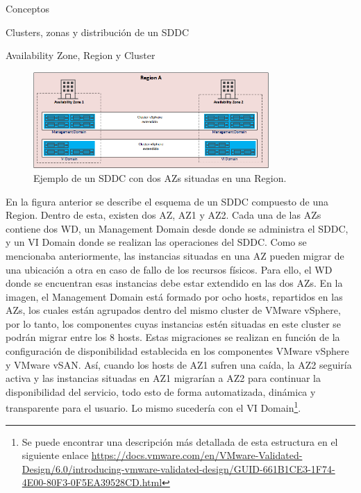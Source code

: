 \begin{section}{Conceptos}
\begin{subsection}{Clusters, zonas y distribución de un SDDC}
\begin{subsubsection}{Availability Zone, Region y Cluster}
\begin{figure}[h!]
  \centering
  \includegraphics[width=0.8\textwidth]{imaxes/conceptosPrevios/AZRegionCluster.png}
  \caption{Ejemplo de un SDDC con dos AZs situadas en una Region.}
  \label{fig:az-region-cluster}
\end{figure}
En la figura anterior se describe el esquema de un SDDC compuesto de una Region. Dentro de esta, existen dos AZ, AZ1 y AZ2. Cada una de las AZs contiene dos WD, un Management Domain desde donde se administra el SDDC, y un VI Domain donde se realizan las operaciones del SDDC. Como se mencionaba anteriormente, las instancias situadas en una AZ pueden migrar de una ubicación a otra en caso de fallo de los recursos físicos. Para ello, el WD donde se encuentran esas instancias debe estar extendido en las dos AZs. En la imagen, el Management Domain está formado por ocho hosts, repartidos en las AZs, los cuales están agrupados dentro del mismo cluster de VMware vSphere, por lo tanto, los componentes cuyas instancias estén situadas en este cluster se podrán migrar entre los 8 hosts. Estas migraciones se realizan en función de la configuración de disponibilidad establecida en los componentes VMware vSphere y VMware vSAN. Así, cuando los hosts de AZ1 sufren una caída, la AZ2 seguiría activa y las instancias situadas en AZ1 migrarían a AZ2 para continuar la disponibilidad del servicio, todo esto de forma automatizada, dinámica y transparente para el usuario. Lo mismo sucedería con el VI Domain\footnote{Se puede encontrar una descripción más detallada de esta estructura en el siguiente enlace \url{https://docs.vmware.com/en/VMware-Validated-Design/6.0/introducing-vmware-validated-design/GUID-661B1CE3-1F74-4E00-80F3-0F5EA39528CD.html}}.



\end{subsubsection}
\end{subsection}
\end{section}
